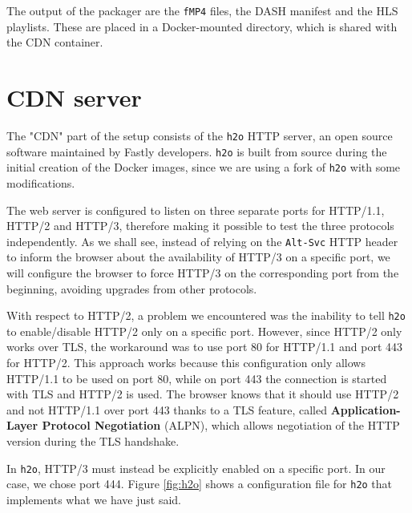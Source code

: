 The output of the packager are the \texttt{fMP4} files, the DASH manifest and the HLS playlists. These are placed in a Docker-mounted directory, which is shared with the CDN container.

\section{CDN server}
\label{sec:testbed/cdn}

The "CDN" part of the setup consists of the \texttt{h2o} HTTP server, an open source software maintained by Fastly developers. \texttt{h2o} is built from source during the initial creation of the Docker images, since we are using a fork of \texttt{h2o} with some modifications.

The web server is configured to listen on three separate ports for HTTP/1.1, HTTP/2 and HTTP/3, therefore making it possible to test the three protocols independently. As we shall see, instead of relying on the \texttt{Alt-Svc} HTTP header to inform the browser about the availability of HTTP/3 on a specific port, we will configure the browser to force HTTP/3 on the corresponding port from the beginning, avoiding upgrades from other protocols.

With respect to HTTP/2, a problem we encountered was the inability to tell \texttt{h2o} to enable/disable HTTP/2 only on a specific port. However, since HTTP/2 only works over TLS, the workaround was to use port 80 for HTTP/1.1 and port 443 for HTTP/2. This approach works because this configuration only allows HTTP/1.1 to be used on port 80, while on port 443 the connection is started with TLS and HTTP/2 is used. The browser knows that it should use HTTP/2 and not HTTP/1.1 over port 443 thanks to a TLS feature, called \textbf{Application-Layer Protocol Negotiation} (ALPN), which allows negotiation of the HTTP version during the TLS handshake.

In \texttt{h2o}, HTTP/3 must instead be explicitly enabled on a specific port. In our case, we chose port 444. Figure \ref{fig:h2o} shows a configuration file for \texttt{h2o} that implements what we have just said.

